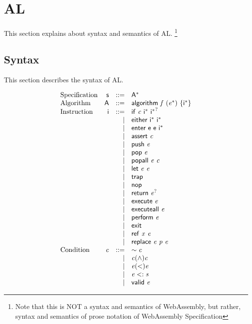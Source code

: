 \section{AL}\label{sec:al}

This section explains about syntax and semantics of AL.
\footnote{Note that this is NOT a syntax and semantics of WebAssembly, but rather,
syntax and semantics of prose notation of WebAssembly Specification}

\subsection{Syntax}

This section describes the syntax of AL.

\begin{minipage}{0.5\textwidth}
$$
\begin{array}{@{}lrrl@{}}
\text{Specification} & \mathsf{s} &::=& {\mathsf{A}^\ast} \\
\text{Algorithm} & \mathsf{A} &::=& \mathsf{algorithm}~\mathit{f}~({\mathit{e}^\ast})~\{{\mathsf{i}^\ast}\} \\
\text{Instruction} & \mathsf{i} &::=& \mathsf{if}~\mathit{c}~{\mathsf{i}^\ast}~{\mathsf{i}^\ast}^? \\ &&|&
\mathsf{either}~{\mathsf{i}^\ast}~{\mathsf{i}^\ast} \\ &&|&
\mathsf{enter}~{\mathsf{e}}~{\mathsf{e}}~{\mathsf{i}^\ast} \\ &&|&
\mathsf{assert}~\mathit{c} \\ &&|&
\mathsf{push}~\mathit{e} \\ &&|&
\mathsf{pop}~\mathit{e} \\ &&|&
\mathsf{popall}~\mathit{e}~\mathit{c} \\ &&|&
\mathsf{let}~\mathit{e}~\mathit{e} \\ &&|&
\mathsf{trap} \\ &&|&
\mathsf{nop} \\ &&|&
\mathsf{return}~{\mathit{e}^?} \\ &&|&
\mathsf{execute}~\mathit{e} \\ &&|&
\mathsf{executeall}~\mathit{e} \\ &&|&
\mathsf{perform}~\mathit{e} \\ &&|&
\mathsf{exit} \\ &&|&
\mathsf{ref}~\mathit{x}~\mathit{e} \\ &&|&
\mathsf{replace}~\mathit{e}~\mathit{p}~\mathit{e} \\
\text{Condition} & \mathit{c} &::=& \sim\mathit{c} \\ &&|&
\mathit{c}(\wedge)\mathit{c} \\ &&|&
\mathit{e}(<)\mathit{e} \\ &&|&
\mathit{e}<:\mathit{s} \\ &&|&
\mathsf{valid}~\mathit{e} \\
\end{array}
$$
\end{minipage}
